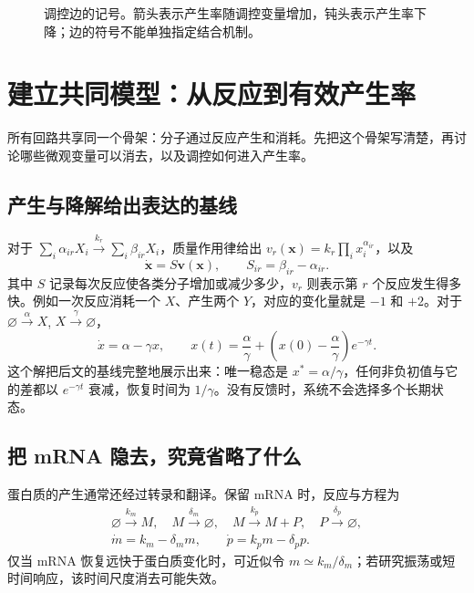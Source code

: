 \documentclass[11pt,a4paper,UTF8,fontset=fandol]{ctexart}
\begin{document}
\begin{figure}[H]\centering
{}
\caption{调控边的记号。箭头表示产生率随调控变量增加，钝头表示产生率下降；边的符号不能单独指定结合机制。}\label{fig:signs}
\end{figure}

\section{建立共同模型：从反应到有效产生率}
所有回路共享同一个骨架：分子通过反应产生和消耗。先把这个骨架写清楚，再讨论哪些微观变量可以消去，以及调控如何进入产生率。
\subsection{产生与降解给出表达的基线}
对于 $\sum_i\alpha_{ir}X_i\xrightarrow{k_r}\sum_i\beta_{ir}X_i$，质量作用律给出 $v_r(\bm x)=k_r\prod_i x_i^{\alpha_{ir}}$，以及
\begin{equation}\dot{\bm x}=S\bm v(\bm x),\qquad S_{ir}=\beta_{ir}-\alpha_{ir}.\end{equation}
其中 $S$ 记录每次反应使各类分子增加或减少多少，$v_r$ 则表示第 $r$ 个反应发生得多快。例如一次反应消耗一个 $X$、产生两个 $Y$，对应的变化量就是 $-1$ 和 $+2$。对于 $\varnothing\xrightarrow{\alpha}X$, $X\xrightarrow{\gamma}\varnothing$，
\begin{equation}\dot x=\alpha-\gamma x,\qquad x(t)=\frac\alpha\gamma+\left(x(0)-\frac\alpha\gamma\right)e^{-\gamma t}.\end{equation}
这个解把后文的基线完整地展示出来：唯一稳态是 $x^*=\alpha/\gamma$，任何非负初值与它的差都以 $e^{-\gamma t}$ 衰减，恢复时间为 $1/\gamma$。没有反馈时，系统不会选择多个长期状态。

\subsection{把 mRNA 隐去，究竟省略了什么}
蛋白质的产生通常还经过转录和翻译。保留 mRNA 时，反应与方程为
\begin{align}
\varnothing\xrightarrow{k_m}M,\quad M\xrightarrow{\delta_m}\varnothing,\quad M\xrightarrow{k_p}M+P,\quad P\xrightarrow{\delta_p}\varnothing,\\[-2pt]
\dot m=k_m-\delta_m m,\qquad\dot p=k_pm-\delta_p p.
\end{align}
仅当 mRNA 恢复远快于蛋白质变化时，可近似令 $m\simeq k_m/\delta_m$；若研究振荡或短时间响应，该时间尺度消去可能失效。
\end{document}
